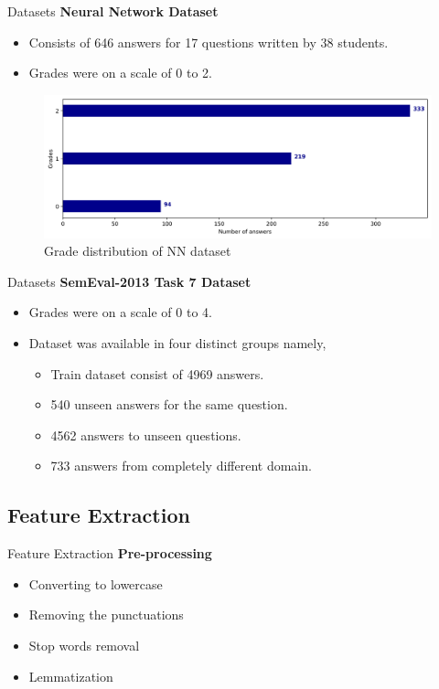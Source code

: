 \documentclass{beamer}
\begin{document}
\begin{frame}{Datasets}	
\textbf{Neural Network Dataset}	

\begin{itemize}
	\item Consists of 646 answers for 17 questions written by 38 students.
	\item Grades were on a scale of 0 to 2.
\end{itemize}
	\begin{figure}[!htb]
		\centering
		\includegraphics[scale=0.36]{images/nngrades}
		\caption{Grade distribution of NN dataset}
		\label{nngrades}
	\end{figure}
	
\end{frame}

\begin{frame}{Datasets}	
	\textbf{SemEval-2013 Task 7 Dataset \cite{dzikovska2013}}	
	\begin{itemize}
		\item Grades were on a scale of 0 to 4.
		\item Dataset was available in four distinct groups namely,
		\begin{itemize}
					\item Train dataset consist of 4969 answers. 
					\item 540 unseen answers for the same question.
					\item 4562 answers to unseen questions.
					\item 733 answers from completely different domain.
		\end{itemize}
	\end{itemize}
	
	
	
\end{frame}

\subsection{Feature Extraction}
\begin{frame}{Feature Extraction}
	\textbf{Pre-processing}
	\begin{itemize}
		\item Converting to lowercase
		\item Removing the punctuations
		\item Stop words removal 
		\item Lemmatization
	\end{itemize}
\end{frame}	
\end{document}
